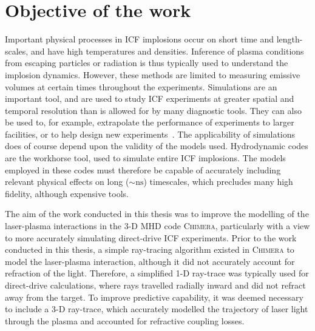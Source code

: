 \section{Objective of the work}%
\label{sec:intro_objective}

Important physical processes in \ac{ICF} implosions occur on short time and length-scales, and have high temperatures and densities.
Inference of plasma conditions from escaping particles or radiation is thus typically used to understand the implosion dynamics.
However, these methods are limited to measuring emissive volumes at certain times throughout the experiments.
Simulations are an important tool, and are used to study \ac{ICF} experiments at greater spatial and temporal resolution than is allowed for by many diagnostic tools.
They can also be used to, for example, extrapolate the performance of experiments to larger facilities, or to help design new experiments~\cite{kritcher_design_2022}.
The applicability of simulations does of course depend upon the validity of the models used.
Hydrodynamic codes are the workhorse tool, used to simulate entire \ac{ICF} implosions.
The models employed in these codes must therefore be capable of accurately including relevant physical effects on long ($\sim\text{ns}$) timescales, which precludes many high fidelity, although expensive tools.

The aim of the work conducted in this thesis was to improve the modelling of the laser-plasma interactions in the 3-D \ac{MHD} code \textsc{Chimera}, particularly with a view to more accurately simulating direct-drive \ac{ICF} experiments.
Prior to the work conducted in this thesis, a simple ray-tracing algorithm existed in \textsc{Chimera} to model the laser-plasma interaction, although it did not accurately account for refraction of the light.
Therefore, a simplified 1-D ray-trace was typically used for direct-drive calculations, where rays travelled radially inward and did not refract away from the target.
To improve predictive capability, it was deemed necessary to include a 3-D ray-trace, which accurately modelled the trajectory of laser light through the plasma and accounted for refractive coupling losses.

